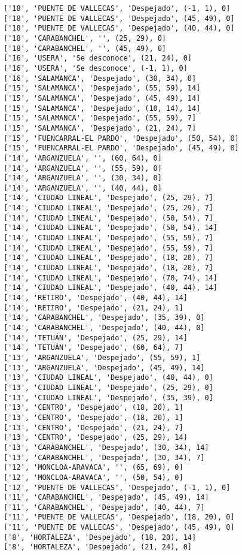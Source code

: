 \documentclass[11pt]{article}
\begin{document}
\begin{Verbatim}[commandchars=\\\{\}]
['18', 'PUENTE DE VALLECAS', 'Despejado', (-1, 1), 0]
['18', 'PUENTE DE VALLECAS', 'Despejado', (45, 49), 0]
['18', 'PUENTE DE VALLECAS', 'Despejado', (40, 44), 0]
['18', 'CARABANCHEL', '', (25, 29), 0]
['18', 'CARABANCHEL', '', (45, 49), 0]
['16', 'USERA', 'Se desconoce', (21, 24), 0]
['16', 'USERA', 'Se desconoce', (-1, 1), 0]
['16', 'SALAMANCA', 'Despejado', (30, 34), 0]
['15', 'SALAMANCA', 'Despejado', (55, 59), 14]
['15', 'SALAMANCA', 'Despejado', (45, 49), 14]
['15', 'SALAMANCA', 'Despejado', (10, 14), 14]
['15', 'SALAMANCA', 'Despejado', (55, 59), 7]
['15', 'SALAMANCA', 'Despejado', (21, 24), 7]
['15', 'FUENCARRAL-EL PARDO', 'Despejado', (50, 54), 0]
['15', 'FUENCARRAL-EL PARDO', 'Despejado', (45, 49), 0]
['14', 'ARGANZUELA', '', (60, 64), 0]
['14', 'ARGANZUELA', '', (55, 59), 0]
['14', 'ARGANZUELA', '', (30, 34), 0]
['14', 'ARGANZUELA', '', (40, 44), 0]
['14', 'CIUDAD LINEAL', 'Despejado', (25, 29), 7]
['14', 'CIUDAD LINEAL', 'Despejado', (25, 29), 7]
['14', 'CIUDAD LINEAL', 'Despejado', (50, 54), 7]
['14', 'CIUDAD LINEAL', 'Despejado', (50, 54), 14]
['14', 'CIUDAD LINEAL', 'Despejado', (55, 59), 7]
['14', 'CIUDAD LINEAL', 'Despejado', (55, 59), 7]
['14', 'CIUDAD LINEAL', 'Despejado', (18, 20), 7]
['14', 'CIUDAD LINEAL', 'Despejado', (18, 20), 7]
['14', 'CIUDAD LINEAL', 'Despejado', (70, 74), 14]
['14', 'CIUDAD LINEAL', 'Despejado', (40, 44), 14]
['14', 'RETIRO', 'Despejado', (40, 44), 14]
['14', 'RETIRO', 'Despejado', (21, 24), 1]
['14', 'CARABANCHEL', 'Despejado', (35, 39), 0]
['14', 'CARABANCHEL', 'Despejado', (40, 44), 0]
['14', 'TETUÁN', 'Despejado', (25, 29), 14]
['14', 'TETUÁN', 'Despejado', (60, 64), 7]
['13', 'ARGANZUELA', 'Despejado', (55, 59), 1]
['13', 'ARGANZUELA', 'Despejado', (45, 49), 14]
['13', 'CIUDAD LINEAL', 'Despejado', (40, 44), 0]
['13', 'CIUDAD LINEAL', 'Despejado', (25, 29), 0]
['13', 'CIUDAD LINEAL', 'Despejado', (35, 39), 0]
['13', 'CENTRO', 'Despejado', (18, 20), 1]
['13', 'CENTRO', 'Despejado', (18, 20), 1]
['13', 'CENTRO', 'Despejado', (21, 24), 7]
['13', 'CENTRO', 'Despejado', (25, 29), 14]
['13', 'CARABANCHEL', 'Despejado', (30, 34), 14]
['13', 'CARABANCHEL', 'Despejado', (30, 34), 7]
['12', 'MONCLOA-ARAVACA', '', (65, 69), 0]
['12', 'MONCLOA-ARAVACA', '', (50, 54), 0]
['12', 'PUENTE DE VALLECAS', 'Despejado', (-1, 1), 0]
['11', 'CARABANCHEL', 'Despejado', (45, 49), 14]
['11', 'CARABANCHEL', 'Despejado', (40, 44), 7]
['11', 'PUENTE DE VALLECAS', 'Despejado', (18, 20), 0]
['11', 'PUENTE DE VALLECAS', 'Despejado', (45, 49), 0]
['8', 'HORTALEZA', 'Despejado', (18, 20), 14]
['8', 'HORTALEZA', 'Despejado', (21, 24), 0]

\end{Verbatim}
\end{document}
